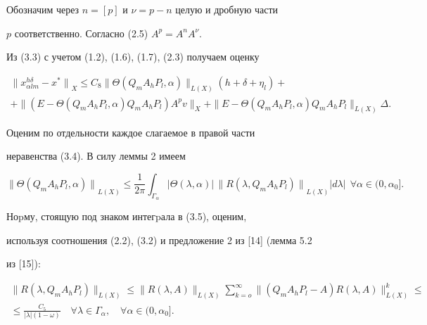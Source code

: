 Обозначим через $n=[p]$ и $\nu =p-n$ целую и дробную части


$p$ соответственно. Согласно (2.5) $A^p=A^n A^{\nu}$.


Из (3.3) с учетом (1.2), (1.6), (1.7), (2.3) получаем оценку


\begin{multline}


{\| x_{\alpha l m}^{h \delta}-x^{*} \|}_X \leq


C_8 \| \Theta(Q_m A_h P_l, \alpha) \|_{L(X)} (h+ \delta +\eta_l)+ \\


%


+\| (E- \Theta (Q_m A_h P_l, \alpha) Q_m A_h P_l) A^p v \|_X +


\| E- \Theta (Q_m A_h P_l, \alpha) Q_m A_h P_l \|_{L(X)}\Delta.


\tag{3.4}


\end{multline}


Оценим по отдельности каждое слагаемое в правой части


неравенства (3.4). В силу леммы 2 имеем


\begin{equation}


{ \| \Theta(Q_m A_h P_l,\alpha) \|}_{L(X)} \leq \frac{1}{2 \pi}


\int_{\Gamma_{\alpha}} | \Theta(\lambda, \alpha)|\,


{\| R(\lambda, Q_m A_h P_l)\|}_{L(X)} | d \lambda |


\ \ \forall \alpha \in (0, \alpha_0]. \tag{3.5}


\end{equation}


Ноpму, стоящую под знаком интегpала в (3.5), оценим,


используя соотношения (2.2), (3.2) и предложение 2 из [14] (лемма 5.2


из [15]):


\begin{multline}


\| R(\lambda, Q_m A_h P_l) \|_{L(X)} \leq


\| R(\lambda, A) \|_{L(X)}{\sum_{k=o}^{\infty}}


\| ( Q_m A_h P_l-A) R(\lambda,A) \|_{L(X)}^k\leq  \\


%


\leq\frac{C_5}{| \lambda | (1- \omega)}


\quad \forall \lambda \in \Gamma_{\alpha},


\quad \forall \alpha \in (0, \alpha_0].


\tag{3.6}


\end{multline}


